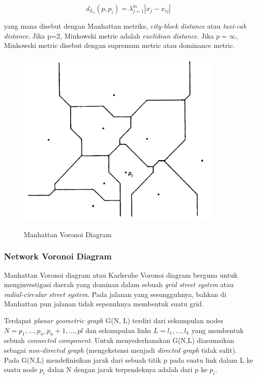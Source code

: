 \begin{equation} \label{manhattan}
d_L_1 (p, p_i) = \lambda_{j=1}^{m} | x_j - x_{ij} |
\end{equation} 

yang mana disebut dengan Manhattan metriks, \textit{city-block distance} atau \textit{taxi-cab distance}. Jika p=2, Minkowski metric adalah \textit{euclidean distance}. Jika $p = \infty$, Minkowski metric disebut dengan supremum metric atau dominance metric. \cite{spatial.tessellations}

\begin{figure}
	\centering
	\includegraphics[width=10cm]{pics/manhattanVoronoiDiagram.png}
	\caption{Manhattan Voronoi Diagram}
	\label{fig:manhattanVoronoiDiagram}
	\cite{spatial.tessellations}
\end{figure}

\subsubsection{Network Voronoi Diagram}

Manhattan Voronoi diagram atau Karlsruhe Voronoi diagram berguna untuk menginvestigasi daerah yang dominan dalam sebuah \textit{grid street system} atau \textit{radial-circular street system}. Pada jalanan yang sesungguhnya, bahkan di Manhattan pun jalanan tidak sepenuhnya membentuk suatu grid. 

Terdapat \textit{planar geometric graph} G(N, L) terdiri dari sekumpulan nodes $N = {p_1,...,p_n,p_n+1,...,pl}$ dan sekumpulan links $L = {l_1,...,l_k}$ yang membentuk sebuah \textit{connected component}. Untuk menyederhanakan G(N,L) diasumsikan sebagai \textit{non-directed graph} (mengekstensi menjadi \textit{directed graph} tidak sulit). Pada G(N,L) mendefinisikan jarak dari sebuah titik p pada suatu link dalam L ke suatu node $p_i$ dalan N dengan jarak terpendeknya adalah dari p ke $p_i$.


